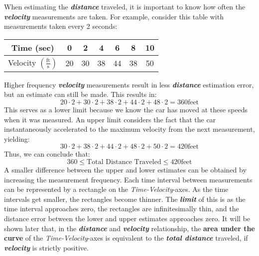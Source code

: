 \vspace{0.1in}
When estimating the \textbf{\textit{distance}} traveled, it is important to know how often the \textbf{\textit{velocity}} measurements are taken. For example, consider this table with measurements taken every 2 seconds:
%
\begin{table}
\begin{center}
\begin{tabular}{ccccccc}
\hline
Time (sec) & 0 & 2 & 4 & 6 & 8 & 10\\
\hline
Velocity $\left(\frac{\text{ft}}{\text{s}}\right)$ & 20 & 30 & 38 & 44 & 38 & 50\\
\hline
\end{tabular}
\end{center}
\end{table}
%
Higher frequency \textbf{\textit{velocity}} measurements result in less \textbf{\textit{distance}} estimation error, but an estimate can still be made. This results in:
%
\begin{equation}
20\cdot2 + 30\cdot2 + 38\cdot2 + 44\cdot2 + 48\cdot2 = 360 \text{feet}
\end{equation}
%
This serves as a lower limit because we know the car has moved at these speeds when it was measured. An upper limit considers the fact that the car instantaneously accelerated to the maximum velocity from the next measurement, yielding:
%
\begin{equation}
30\cdot2 + 38\cdot2 + 44\cdot2 + 48\cdot2 + 50\cdot2 = 420 \text{feet}
\end{equation}
%
Thus, we can conclude that:
%
\begin{equation}
360 \leq \text{Total Distance Traveled} \leq 420 \text{feet}
\end{equation}
%
A smaller difference between the upper and lower estimates can be obtained by increasing the measurement frequency. Each time interval between measurements can be represented by a rectangle on the \textit{Time-Velocity}-axes. As the time intervals get smaller, the rectangles become thinner. The \textbf{\textit{limit}} of this is as the time interval approaches zero, the rectangles are infinitesimally thin, and the distance error between the lower and upper estimates approaches zero. It will be shown later that, in the \textbf{\textit{distance}} and \textbf{\textit{velocity}} relationship, the \textbf{\textbf{area under the curve}} of the \textit{Time-Velocity}-axes is equivalent to the \textbf{\textit{total distance}} traveled, if \textbf{\textit{velocity}} is strictly positive.


